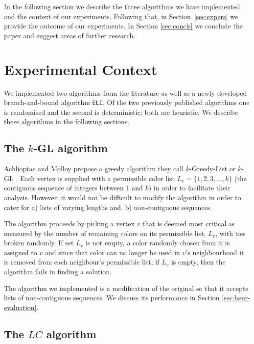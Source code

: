 \documentclass[10pt]{article}
\begin{document}
In the following section we describe the three algorithms we have
implemented and the context of our experiments.  Following that, in
Section~\ref{sec:expers} we provide the outcome of our experiments.  In
Section \ref{sec:concls} we conclude the paper and suggest areas of
further research.

\section{Experimental Context}\label{sec:exper-context}

We implemented two algorithms from the literature as well as a newly
developed branch-and-bound algorithm \texttt{ELC}.  Of the two previously published
algorithms one is randomised and the second is deterministic; both are
heuristic.  We describe these algorithms in the following sections.

\subsection{The $k$-GL algorithm}\label{sec:k-gl-alg}

Achlioptas and Molloy propose a greedy algorithm they call
$k$-Greedy-List or $k$-GL \cite{Achlioptas97theanalysis}.  Each vertex
is supplied with a permissible color list $L_v = \{1, 2, 3, ..., k\}$
(the contiguous sequence of integers between 1 and $k$) in order to
facilitate their analysis.  However, it would not be difficult to modify
the algorithm in order to cater for a) lists of varying lengths and, b)
non-contiguous sequences.

The algorithm proceeds by picking a vertex $v$ that is deemed most
critical as measured by the number of remaining colors on its
permissible list, $L_v$, with ties broken randomly.  If set $L_v$ is not
empty, a color randomly chosen from it is assigned to $v$ and since that
color can no longer be used in $v$'s neighbourhood it is removed from
each neighbour's permissible list; if $L_v$ is empty, then the
algorithm fails in finding a solution.

The algorithm we implemented is a modification
of the original \cite{Achlioptas97theanalysis} so that it accepts lists
of non-contiguous sequences.  We discuss its performance in Section
\ref{sec:heur-evaluation}.

\subsection{The $LC$ algorithm}
\end{document}
